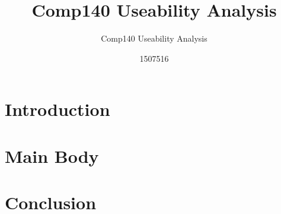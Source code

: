 \documentclass{scrartcl}
\title{Comp140 Useability Analysis}
\subtitle{Comp140 Useability Analysis}
\author{1507516}
\begin{document}
\maketitle

\abstract{}

\section{Introduction}

\section{Main Body}

\section{Conclusion}



\end{document}

